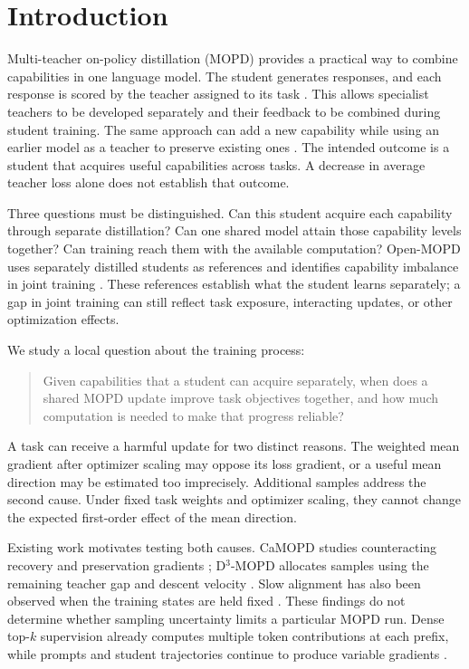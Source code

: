 \section{Introduction}
\label{sec:intro}

Multi-teacher on-policy distillation (MOPD) provides a practical way to
combine capabilities in one language model. The student generates responses,
and each response is scored by the teacher assigned to its task
\citep{ma2026mopdmultiteacheronpolicydistillation}. This allows specialist
teachers to be developed separately and their feedback to be combined during
student training. The same approach can add a new capability while using an
earlier model as a teacher to preserve existing ones
\citep{liu2026instella}. The intended outcome is a student that acquires
useful capabilities across tasks. A decrease in average teacher loss alone
does not establish that outcome.

Three questions must be distinguished. Can this student acquire each
capability through separate distillation? Can one shared model attain
those capability levels together? Can training reach them with the
available computation? Open-MOPD uses separately distilled students as
references and identifies capability imbalance in joint training
\citep{gao2026openmopddiagnosingfixingcapability}. These references establish
what the student learns separately; a gap in joint training can still
reflect task exposure, interacting updates, or other optimization effects.

We study a local question about the training process:
\begin{quote}
Given capabilities that a student can acquire separately, when does a
shared MOPD update improve task objectives together, and how much
computation is needed to make that progress reliable?
\end{quote}
A task can receive a harmful update for two distinct reasons. The weighted
mean gradient after optimizer scaling may oppose its loss gradient, or a
useful mean direction may be estimated too imprecisely. Additional samples
address the second cause.
Under fixed task weights and optimizer scaling, they cannot change the
expected first-order effect of the mean direction.

Existing work motivates testing both causes. CaMOPD studies counteracting
recovery and preservation gradients \citep{chen2026camopd}; D$^3$-MOPD
allocates samples using the remaining teacher gap and descent velocity
\citep{sun2026d3mopd}. Slow alignment has also been observed when the
training states are held fixed \citep{fu2026rethinkingopd2}. These findings
do not determine whether sampling uncertainty limits a particular MOPD
run. Dense top-$k$ supervision already computes multiple token
contributions at each prefix, while prompts and student trajectories
continue to produce variable gradients
\citep{ma2026mopdmultiteacheronpolicydistillation}.

